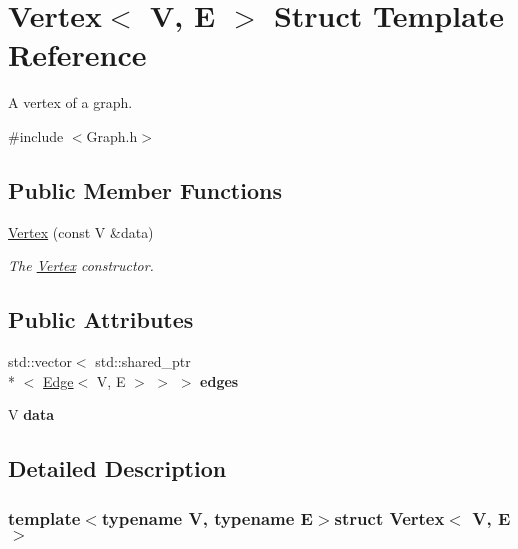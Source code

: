 \hypertarget{struct_vertex}{\section{Vertex$<$ V, E $>$ Struct Template Reference}
\label{struct_vertex}
}


A vertex of a graph.  




{\ttfamily \#include $<$Graph.\+h$>$}

\subsection*{Public Member Functions}
\begin{DoxyCompactItemize}
\item 
\hyperlink{struct_vertex_a569a8010956627ab0ac58e1fb1e1de4d}{Vertex} (const V \&data)
\begin{DoxyCompactList}\small\item\em The \hyperlink{struct_vertex}{Vertex} constructor. \end{DoxyCompactList}\end{DoxyCompactItemize}
\subsection*{Public Attributes}
\begin{DoxyCompactItemize}
\item 
\hypertarget{struct_vertex_af47912126bbfe4893d568e208e111bbc}{std\+::vector$<$ std\+::shared\+\_\+ptr\\*
$<$ \hyperlink{struct_edge}{Edge}$<$ V, E $>$ $>$ $>$ {\bfseries edges}}\label{struct_vertex_af47912126bbfe4893d568e208e111bbc}

\item 
\hypertarget{struct_vertex_a29eb2f1e637ae21a217c934d7dc51fc6}{V {\bfseries data}}\label{struct_vertex_a29eb2f1e637ae21a217c934d7dc51fc6}

\end{DoxyCompactItemize}


\subsection{Detailed Description}
\subsubsection*{template$<$typename V, typename E$>$struct Vertex$<$ V, E $>$}

